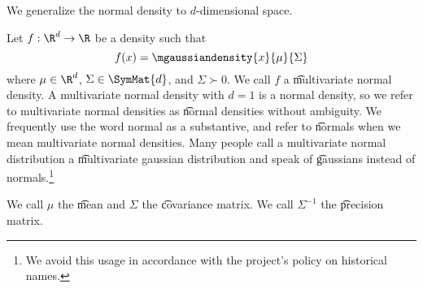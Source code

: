 

We generalize the normal density
to $d$-dimensional space.


Let $f: \R^d \to \R$ be a density such that $$f(x) = \mgaussiandensity{x}{\mu}{\Sigma}$$ where $\mu \in \R^d$, $\Sigma \in \SymMat{d}$, and $\Sigma \succ 0$.
We call $f$ a \t{multivariate normal density}.
A multivariate normal density with $d = 1$ is a normal density, so we refer to multivariate normal densities as \t{normal densities} without ambiguity.
We frequently use the word normal as a substantive, and refer to \t{normals} when we mean multivariate normal densities.
Many people call a multivariate normal distribution a \t{multivariate gaussian distribution} and speak of \t{gaussians} instead of normals.\footnote{We avoid this usage in accordance with the project's policy on historical names.}

We call $\mu$ the \t{mean} and $\Sigma$ the \t{covariance matrix}.
We call $\Sigma^{-1}$ the \t{precision matrix}.

\blankpage
